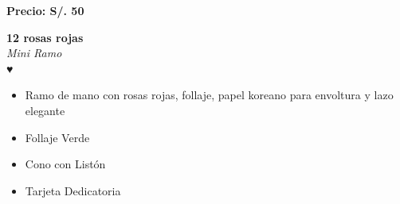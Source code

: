 \documentclass{article}
\begin{document}
\vspace{0.3cm}
\begin{center}
   \textbf{\Large Precio: \textcolor{cpred}{S/. 50 }}
\end{center}
\vspace{1cm}
\noindent
\begin{minipage}{0.6\textwidth}
    \textcolor{cpred}{\textbf{\huge 12 rosas rojas }}\\
    {\textit{Mini Ramo}} \\
    \textcolor{cpred}{\Huge ♥} \\
    \vspace{0.5cm}
    \begin{itemize}
        \item Ramo de mano con rosas rojas, follaje, papel koreano para envoltura y lazo elegante
        \item Follaje Verde
        \item Cono con Listón
        \item Tarjeta Dedicatoria
    \end{itemize}
\end{minipage}
\hspace{1cm}
\end{document}
